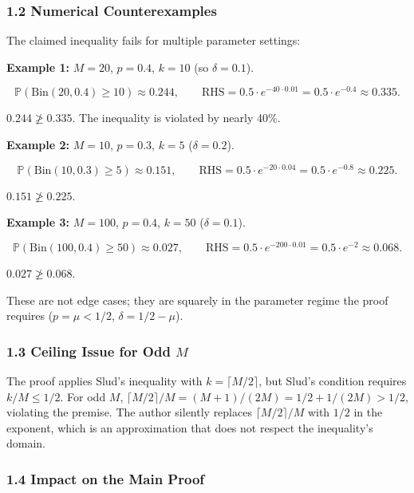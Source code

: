 \documentclass[
  12pt,
]{article}
\begin{document}
\subsubsection{1.2 Numerical
Counterexamples}\label{numerical-counterexamples}

The claimed inequality fails for multiple parameter settings:

\textbf{Example 1:} \(M=20\), \(p=0.4\), \(k=10\) (so \(\delta=0.1\)).

\[\mathbb{P}(\text{Bin}(20,0.4) \geq 10) \approx 0.244, \qquad \text{RHS} = 0.5\cdot e^{-40\cdot 0.01} = 0.5\cdot e^{-0.4} \approx 0.335.\]

\(0.244 \not\geq 0.335\). The inequality is violated by nearly 40\%.

\textbf{Example 2:} \(M=10\), \(p=0.3\), \(k=5\) (\(\delta=0.2\)).

\[\mathbb{P}(\text{Bin}(10,0.3) \geq 5) \approx 0.151, \qquad \text{RHS} = 0.5\cdot e^{-20\cdot 0.04}=0.5\cdot e^{-0.8} \approx 0.225.\]

\(0.151 \not\geq 0.225\).

\textbf{Example 3:} \(M=100\), \(p=0.4\), \(k=50\) (\(\delta=0.1\)).

\[\mathbb{P}(\text{Bin}(100,0.4) \geq 50) \approx 0.027, \qquad \text{RHS} = 0.5\cdot e^{-200\cdot 0.01}=0.5\cdot e^{-2} \approx 0.068.\]

\(0.027 \not\geq 0.068\).

These are not edge cases; they are squarely in the parameter regime the
proof requires (\(p=\mu<1/2\), \(\delta=1/2-\mu\)).

\subsubsection{\texorpdfstring{1.3 Ceiling Issue for Odd
\(M\)}{1.3 Ceiling Issue for Odd M}}\label{ceiling-issue-for-odd-m}

The proof applies Slud's inequality with \(k = \lceil M/2\rceil\), but
Slud's condition requires \(k/M \leq 1/2\). For odd \(M\),
\(\lceil M/2\rceil/M = (M+1)/(2M) = 1/2 + 1/(2M) > 1/2\), violating the
premise. The author silently replaces \(\lceil M/2\rceil/M\) with
\(1/2\) in the exponent, which is an approximation that does not respect
the inequality's domain.

\subsubsection{1.4 Impact on the Main
Proof}\label{impact-on-the-main-proof}
\end{document}
